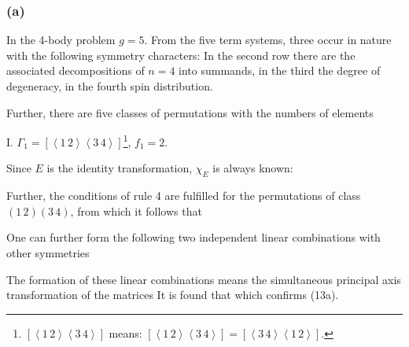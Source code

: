 \begin{paper}{1}
\subsubsection*{(a)} In the 4-body problem $g=5$. From the five term systems, three occur in nature with the following symmetry characters:
In the second row there are the associated decompositions of $n=4$ into summands, in the third the degree of degeneracy, in the fourth  spin distribution.

Further, there are five classes of permutations with the numbers of elements

I. $\Gamma_1 = \left[\left<1\,2\right>\left<3\,4\right>\right]$\footnote{$\left[\left<1\,2\right>\left<3\,4\right>\right]$ means: $\left[\left<1\,2\right>\left<3\,4\right>\right] = \left[\left<3\,4\right>\left<1\,2\right>\right]$.}, $f_1=2$.

Since $E$ is the identity transformation, $\chi_E$ is always known:

Further, the conditions of rule 4 are fulfilled for the permutations of class $(1\,2)(3\,4)$, from which it follows that

One can further form the following two independent linear combinations with other symmetries

The formation of these linear combinations means the simultaneous principal axis transformation of the matrices
It is found that
which confirms (13a).


\end{paper}
